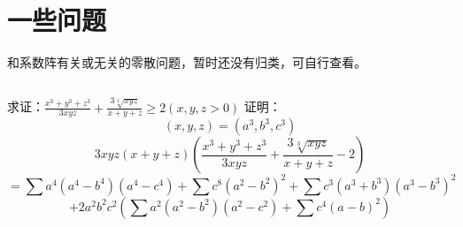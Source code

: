 \documentclass[UTF8]{ctexart}
\begin{document}
\section{一些问题}
和系数阵有关或无关的零散问题，暂时还没有归类，可自行查看。
\subsection{}
求证：$ \displaystyle \frac{x^{3}+y^{3}+z^{3}}{3 x y z}+\displaystyle \frac{3 \sqrt[3]{x y z}}{x+y+z} \geq 2(x, y, z>0) $
证明：
$$ (x, y, z)=\left(a^{3}, b^{3}, c^{3}\right) $$
$$3 x y z(x+y+z)\left(\displaystyle \frac{x^{3}+y^{3}+z^{3}}{3 x y z}+\displaystyle \frac{3 \sqrt[3]{x y z}}{x+y+z}-2\right) $$
$$ =\displaystyle \sum a^{4}\left(a^{4}-b^{4}\right)\left(a^{4}-c^{4}\right)+\displaystyle \sum c^{8}\left(a^{2}-b^{2}\right)^{2}+\displaystyle \sum c^{3}\left(a^{3}+b^{3}\right)\left(a^{3}-b^{3}\right)^{2} $$
$$ +2 a^{2} b^{2} c^{2}\left(\displaystyle \sum a^{2}\left(a^{2}-b^{2}\right)\left(a^{2}-c^{2}\right)+\displaystyle \sum c^{4}(a-b)^{2}\right) $$
\end{document}
